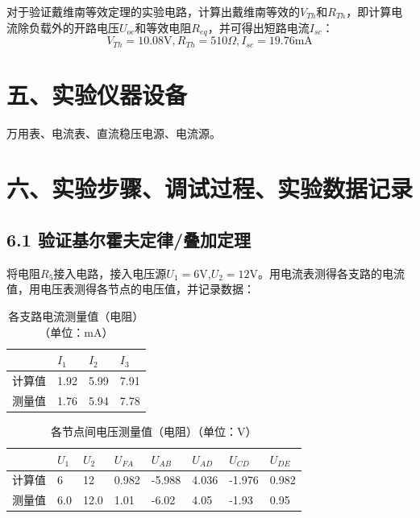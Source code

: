 \documentclass[12pt,a4paper]{article}
\begin{document}
对于验证戴维南等效定理的实验电路，计算出戴维南等效的$V_{Th}$和$R_{Th}$，即计算电流除负载外的开路电压$U_{oc}$和等效电阻$R_{eq}$，并可得出短路电流$I_{sc}$：
$$V_{Th}=10.08\mathrm{V},R_{Th}=510\Omega,I_{sc}=19.76\mathrm{mA}$$


\section*{五、实验仪器设备}

万用表、电流表、直流稳压电源、电流源。

\section*{六、实验步骤、调试过程、实验数据记录}

\subsection*{6.1 验证基尔霍夫定律/叠加定理}


将电阻$R_{5}$接入电路，接入电压源$U_{1}=6$V,$U_{2}=12$V。用电流表测得各支路的电流值，用电压表测得各节点的电压值，并记录数据：





\begin{table}[H]
\centering
\caption{各支路电流测量值（电阻）（单位：mA）} 
\renewcommand{\arraystretch}{1.2}
\small
\begin{tabular}{|p{1.5cm}|p{1.3cm}|p{1.3cm}|p{1.3cm}|}
\hline
& $I_{1}$ & $I_{2}$ & $I_{3}$ \\
\hline
计算值 & 1.92 & 5.99 & 7.91 \\
\hline
测量值 & 1.76 & 5.94 & 7.78\\
\hline
\end{tabular}

\end{table}

\begin{table}[H]
\centering
\caption{各节点间电压测量值（电阻）（单位：V）} 
\renewcommand{\arraystretch}{1.2}
\small
\begin{tabular}{|p{1.3cm}|p{1.1cm}|p{1.1cm}|p{1.1cm}|p{1.1cm}|p{1.1cm}|p{1.1cm}|p{1.1cm}|}
\hline
& $U_{1}$ & $U_{2}$ & $U_{FA}$ & $U_{AB}$ & $U_{AD}$ & $U_{CD}$ & $U_{DE}$ \\
\hline
计算值 & 6 & 12 & 0.982 & -5.988 & 4.036 & -1.976 & 0.982 \\
\hline
测量值 &6.0 &12.0 &1.01 &-6.02 &4.05 &-1.93 &0.95 \\
\hline
\end{tabular}

\end{table}
\end{document}
